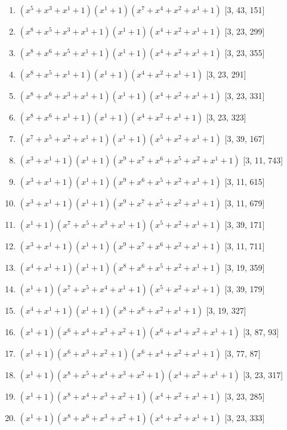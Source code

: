 \documentclass[10pt,twocolumn]{article}
\begin{document}
\begin{enumerate}
\item $(x^{5} + x^{3} + x^{1} + 1)(x^{1} + 1)(x^{7} + x^{4} + x^{2} + x^{1} + 1)$  [3, 43, 151]
\item $(x^{8} + x^{5} + x^{3} + x^{1} + 1)(x^{1} + 1)(x^{4} + x^{2} + x^{1} + 1)$  [3, 23, 299]
\item $(x^{8} + x^{6} + x^{5} + x^{1} + 1)(x^{1} + 1)(x^{4} + x^{2} + x^{1} + 1)$  [3, 23, 355]
\item $(x^{8} + x^{5} + x^{1} + 1)(x^{1} + 1)(x^{4} + x^{2} + x^{1} + 1)$  [3, 23, 291]
\item $(x^{8} + x^{6} + x^{3} + x^{1} + 1)(x^{1} + 1)(x^{4} + x^{2} + x^{1} + 1)$  [3, 23, 331]
\item $(x^{8} + x^{6} + x^{1} + 1)(x^{1} + 1)(x^{4} + x^{2} + x^{1} + 1)$  [3, 23, 323]
\item $(x^{7} + x^{5} + x^{2} + x^{1} + 1)(x^{1} + 1)(x^{5} + x^{2} + x^{1} + 1)$  [3, 39, 167]
\item $(x^{3} + x^{1} + 1)(x^{1} + 1)(x^{9} + x^{7} + x^{6} + x^{5} + x^{2} + x^{1} + 1)$  [3, 11, 743]
\item $(x^{3} + x^{1} + 1)(x^{1} + 1)(x^{9} + x^{6} + x^{5} + x^{2} + x^{1} + 1)$  [3, 11, 615]
\item $(x^{3} + x^{1} + 1)(x^{1} + 1)(x^{9} + x^{7} + x^{5} + x^{2} + x^{1} + 1)$  [3, 11, 679]
\item $(x^{1} + 1)(x^{7} + x^{5} + x^{3} + x^{1} + 1)(x^{5} + x^{2} + x^{1} + 1)$  [3, 39, 171]
\item $(x^{3} + x^{1} + 1)(x^{1} + 1)(x^{9} + x^{7} + x^{6} + x^{2} + x^{1} + 1)$  [3, 11, 711]
\item $(x^{4} + x^{1} + 1)(x^{1} + 1)(x^{8} + x^{6} + x^{5} + x^{2} + x^{1} + 1)$  [3, 19, 359]
\item $(x^{1} + 1)(x^{7} + x^{5} + x^{4} + x^{1} + 1)(x^{5} + x^{2} + x^{1} + 1)$  [3, 39, 179]
\item $(x^{4} + x^{1} + 1)(x^{1} + 1)(x^{8} + x^{6} + x^{2} + x^{1} + 1)$  [3, 19, 327]
\item $(x^{1} + 1)(x^{6} + x^{4} + x^{3} + x^{2} + 1)(x^{6} + x^{4} + x^{2} + x^{1} + 1)$  [3, 87, 93]
\item $(x^{1} + 1)(x^{6} + x^{3} + x^{2} + 1)(x^{6} + x^{4} + x^{2} + x^{1} + 1)$  [3, 77, 87]
\item $(x^{1} + 1)(x^{8} + x^{5} + x^{4} + x^{3} + x^{2} + 1)(x^{4} + x^{2} + x^{1} + 1)$  [3, 23, 317]
\item $(x^{1} + 1)(x^{8} + x^{4} + x^{3} + x^{2} + 1)(x^{4} + x^{2} + x^{1} + 1)$  [3, 23, 285]
\item $(x^{1} + 1)(x^{8} + x^{6} + x^{3} + x^{2} + 1)(x^{4} + x^{2} + x^{1} + 1)$  [3, 23, 333]

\end{enumerate}
\end{document}
